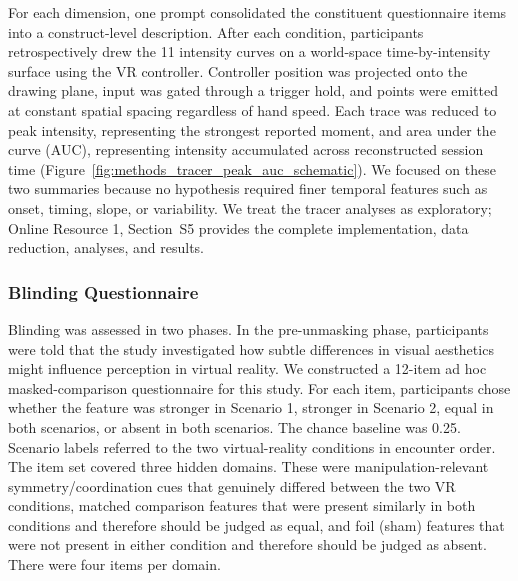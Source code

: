 \documentclass[pdflatex,sn-basic,lineno]{sn-jnl}
\begin{document}
For each dimension, one prompt consolidated the constituent questionnaire items into a construct-level description. After each condition, participants retrospectively drew the 11 intensity curves on a world-space time-by-intensity surface using the VR controller. Controller position was projected onto the drawing plane, input was gated through a trigger hold, and points were emitted at constant spatial spacing regardless of hand speed. Each trace was reduced to peak intensity, representing the strongest reported moment, and area under the curve (AUC), representing intensity accumulated across reconstructed session time (Figure~\ref{fig:methods_tracer_peak_auc_schematic}). We focused on these two summaries because no hypothesis required finer temporal features such as onset, timing, slope, or variability. We treat the tracer analyses as exploratory; Online Resource 1, Section~S5 provides the complete implementation, data reduction, analyses, and results.

\subsubsection{Blinding Questionnaire}\label{subsubsec:measures_blinding}
Blinding was assessed in two phases. In the pre-unmasking phase, participants were told that the study investigated how subtle differences in visual aesthetics might influence perception in virtual reality. We constructed a 12-item ad hoc masked-comparison questionnaire for this study. For each item, participants chose whether the feature was stronger in Scenario 1, stronger in Scenario 2, equal in both scenarios, or absent in both scenarios. The chance baseline was 0.25. Scenario labels referred to the two virtual-reality conditions in encounter order. The item set covered three hidden domains. These were manipulation-relevant symmetry/coordination cues that genuinely differed between the two VR conditions, matched comparison features that were present similarly in both conditions and therefore should be judged as equal, and foil (sham) features that were not present in either condition and therefore should be judged as absent. There were four items per domain.
\end{document}
